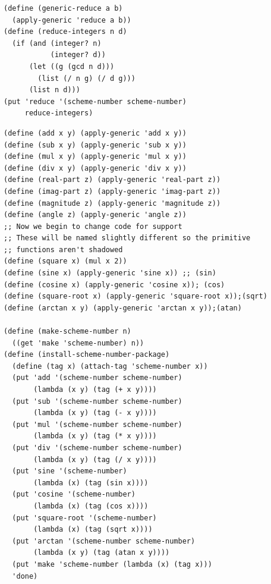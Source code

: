 \documentclass[final,fleqn,titlepage,twoside]{article}
\begin{document}
\begin{verbatim}
(define (generic-reduce a b)
  (apply-generic 'reduce a b))
(define (reduce-integers n d)
  (if (and (integer? n)
           (integer? d))
      (let ((g (gcd n d)))
        (list (/ n g) (/ d g)))
      (list n d)))
(put 'reduce '(scheme-number scheme-number)
     reduce-integers)
\end{verbatim}
\begin{verbatim}
(define (add x y) (apply-generic 'add x y))
(define (sub x y) (apply-generic 'sub x y))
(define (mul x y) (apply-generic 'mul x y))
(define (div x y) (apply-generic 'div x y))
(define (real-part z) (apply-generic 'real-part z))
(define (imag-part z) (apply-generic 'imag-part z))
(define (magnitude z) (apply-generic 'magnitude z))
(define (angle z) (apply-generic 'angle z))
;; Now we begin to change code for support
;; These will be named slightly different so the primitive
;; functions aren't shadowed
(define (square x) (mul x 2))
(define (sine x) (apply-generic 'sine x)) ;; (sin)
(define (cosine x) (apply-generic 'cosine x)); (cos)
(define (square-root x) (apply-generic 'square-root x));(sqrt)
(define (arctan x y) (apply-generic 'arctan x y));(atan)

(define (make-scheme-number n)
  ((get 'make 'scheme-number) n))
(define (install-scheme-number-package)
  (define (tag x) (attach-tag 'scheme-number x))
  (put 'add '(scheme-number scheme-number)
       (lambda (x y) (tag (+ x y))))
  (put 'sub '(scheme-number scheme-number)
       (lambda (x y) (tag (- x y))))
  (put 'mul '(scheme-number scheme-number)
       (lambda (x y) (tag (* x y))))
  (put 'div '(scheme-number scheme-number)
       (lambda (x y) (tag (/ x y))))
  (put 'sine '(scheme-number)
       (lambda (x) (tag (sin x))))
  (put 'cosine '(scheme-number)
       (lambda (x) (tag (cos x))))
  (put 'square-root '(scheme-number)
       (lambda (x) (tag (sqrt x))))
  (put 'arctan '(scheme-number scheme-number)
       (lambda (x y) (tag (atan x y))))
  (put 'make 'scheme-number (lambda (x) (tag x)))
  'done)


\end{verbatim}
\end{document}
